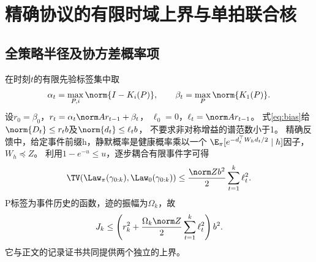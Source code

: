 \section{精确协议的有限时域上界与单拍联合核}
\label{app:single}
\subsection{全策略半径及协方差概率项}
在时刻$t$的有限先验标签集中取
\[
\alpha_t=\max_{P,i}\norm{I-K_i(P)},\qquad \beta_t=\max_P\norm{K_1(P)}.
\]
设$r_0=\beta_0$，$r_t=\alpha_t\norm A r_{t-1}+\beta_t$，
$\ell_0=0$，$\ell_t=\norm A r_{t-1}$。
式\eqref{eq:bias}给$\norm{D_t}\le r_tb$及$\norm{d_t}\le\ell_tb$，
不要求非对称增益的谱范数小于1。
精确反馈中，给定事件前缀h，静默概率是健康概率乘以一个
$\E_\pi[e^{-d_t^\top W_hd_t/2}\mid h]$因子，$W_h\preceq Z$。
利用$1-e^{-u}\le u$，逐步耦合有限事件字可得
\[
\TV(\Law_\pi(\gamma_{0:k}),\Law_0(\gamma_{0:k}))
\le\frac{\norm Z b^2}{2}\sum_{t=1}^k\ell_t^2.
\]
P标签为事件历史的函数，迹的振幅为$\Omega_k$，故
\[
J_k\le
\left(r_k^2+\frac{\Omega_k\norm Z}{2}\sum_{t=1}^k\ell_t^2\right)b^2.
\]
它与正文的记录证书共同提供两个独立的上界。

